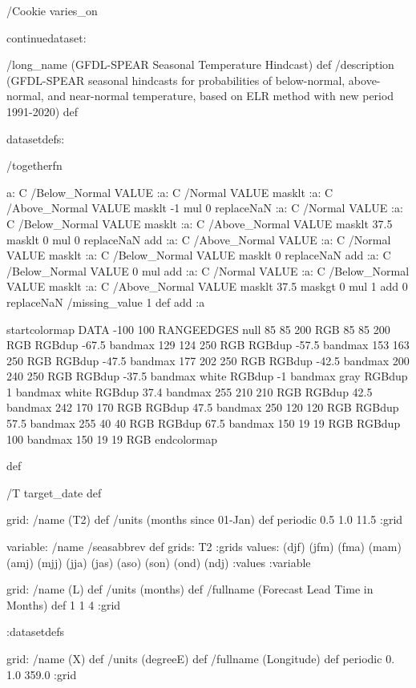 \begin{ingrid}

/Cookie varies_on

continuedataset:

/long_name (GFDL-SPEAR Seasonal Temperature Hindcast) def
/description (GFDL-SPEAR seasonal hindcasts for probabilities of below-normal, above-normal, and near-normal temperature, based on ELR method with new period 1991-2020) def

datasetdefs:

/togetherfn {
 a:
    C /Below_Normal VALUE
    :a:
     C /Normal VALUE
     masklt
    :a:
     C /Above_Normal VALUE
     masklt
    -1 mul
    0 replaceNaN
    :a:
     C /Normal VALUE
     :a:
      C /Below_Normal VALUE
      masklt
     :a:
      C /Above_Normal VALUE
      masklt
     37.5 masklt
     0 mul
     0 replaceNaN           
     add
    :a:
     C /Above_Normal VALUE
     :a:
      C /Normal VALUE
      masklt
     :a:
      C /Below_Normal VALUE
      masklt
     0 replaceNaN
     add
 :a:
     C /Below_Normal VALUE
     0 mul
     add
    :a:
     C /Normal VALUE
     :a:
      C /Below_Normal VALUE
      masklt
     :a:
      C /Above_Normal VALUE        
      masklt
     37.5 maskgt
     0 mul
     1 add
     0 replaceNaN
     /missing_value 1 def
     add
    :a

startcolormap
DATA -100 100 RANGEEDGES
null 85 85 200 RGB
85 85 200 RGB RGBdup -67.5 bandmax
129 124 250 RGB RGBdup -57.5 bandmax
153 163 250 RGB RGBdup -47.5 bandmax
177 202 250 RGB RGBdup -42.5 bandmax
200 240 250 RGB RGBdup -37.5 bandmax
white RGBdup -1 bandmax
gray RGBdup 1 bandmax
white RGBdup 37.4 bandmax
255 210 210 RGB RGBdup 42.5 bandmax
242 170 170 RGB RGBdup 47.5 bandmax
250 120 120 RGB RGBdup 57.5 bandmax
255 40 40 RGB RGBdup 67.5 bandmax
150 19 19 RGB RGBdup 100 bandmax
150 19 19 RGB
endcolormap
} def 

/T {target_date} def

grid:
/name (T2) def
/units (months since 01-Jan) def
periodic
0.5 1.0 11.5
:grid

variable:
/name /seasabbrev def
grids: T2 :grids
values: (djf) (jfm) (fma) (mam) (amj) (mjj) (jja) (jas) (aso) (son) (ond) (ndj) :values
:variable

 grid:
 /name (L) def
 /units (months) def
 /fullname (Forecast Lead Time in Months) def
 1 1 4
 :grid

:datasetdefs

grid:
/name (X) def
/units (degreeE) def
/fullname (Longitude) def
periodic
0. 1.0 359.0
:grid


\end{ingrid}
